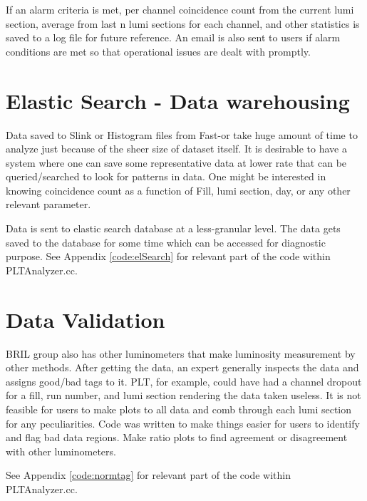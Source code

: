 If an alarm criteria is met, per channel coincidence count from the current lumi section, average from last n lumi sections for each channel, and other statistics is saved to a log file for future reference. An email is  also sent to users if alarm conditions are met so that operational issues are dealt with promptly.
		
\section{Elastic Search - Data warehousing} \label{sec:elSearch}

Data saved to Slink or Histogram files from Fast-or take huge amount of time to analyze just because of the sheer size of dataset itself. It is desirable to have a system where one can save some representative data at lower rate that can be queried/searched to look for patterns in data. One might be interested in knowing coincidence count as a function of Fill, lumi section, day, or any other relevant parameter.


Data is sent to elastic search database at a less-granular level. The data gets saved to the database for some time which can be accessed for diagnostic purpose. See Appendix \ref{code:elSearch} for relevant part of the code within PLTAnalyzer.cc.


\section{Data Validation} \label{sec:NormTags}
BRIL group also has other luminometers that make luminosity measurement by other methods. After getting the data, an expert generally inspects the data and assigns good/bad tags to it. PLT, for example, could have had a channel dropout for a fill, run number, and lumi section rendering the data taken useless. It is not feasible for users to make plots to all data and comb through each lumi section for any peculiarities. Code was written to make things easier for users to identify and flag bad data regions. Make ratio plots to find agreement or disagreement with other luminometers. 

\noindent
See Appendix \ref{code:normtag} for relevant part of the code within PLTAnalyzer.cc.

